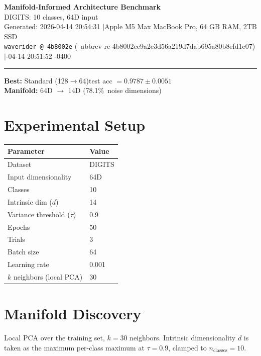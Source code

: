 \documentclass[11pt,letterpaper]{article}
\begin{document}
\begin{center}
  {\LARGE\bfseries\color{wavblue} Manifold-Informed Architecture Benchmark}\\[6pt]
  {\large DIGITS: 10 classes, 64D input}\\[8pt]
  {\small Generated: 2026-04-14 20:54:31 \quad$|$\quad Apple M5 Max MacBook Pro, 64 GB RAM, 2TB SSD}\\[2pt]
  {\small\texttt{waverider @ 4b8002e} (--abbrev-re
4b8002ee9a2e3d56a219d7dab695a80b8efd1e07) \quad$|$-04-14 20:51:52 -0400}
\end{center}
{\color{wavblue}\noindent\rule{\linewidth}{1.5pt}}
\medskip

\noindent\colorbox{wavlight}{\parbox{\dimexpr\linewidth-2\fboxsep\relax}{
  \smallskip
  \textbf{Best:} Standard (128$\rightarrow$64)\quad test acc $= 0.9787 \pm 0.0051$\\[2pt]
  \textbf{Manifold:} 64D $\rightarrow$ 14D (78.1\%\ noise dimensions)\\[2pt]
  \smallskip
}}
\bigskip

\section{Experimental Setup}

\begin{tabular}{@{}ll@{}}
\toprule
\textbf{Parameter} & \textbf{Value} \\
\midrule
  Dataset & DIGITS \\
  Input dimensionality & 64D \\
  Classes & 10 \\
  Intrinsic dim ($d$) & 14 \\
  Variance threshold ($\tau$) & 0.9 \\
  Epochs & 50 \\
  Trials & 3 \\
  Batch size & 64 \\
  Learning rate & 0.001 \\
  $k$ neighbors (local PCA) & 30 \\
\bottomrule
\end{tabular}

\section{Manifold Discovery}

Local PCA over the training set, $k = 30$ neighbors. Intrinsic dimensionality $d$ is taken as the maximum per-class maximum at $\tau = 0.9$, clamped to $n_{\mathrm{classes}} = 10$.
\end{document}
